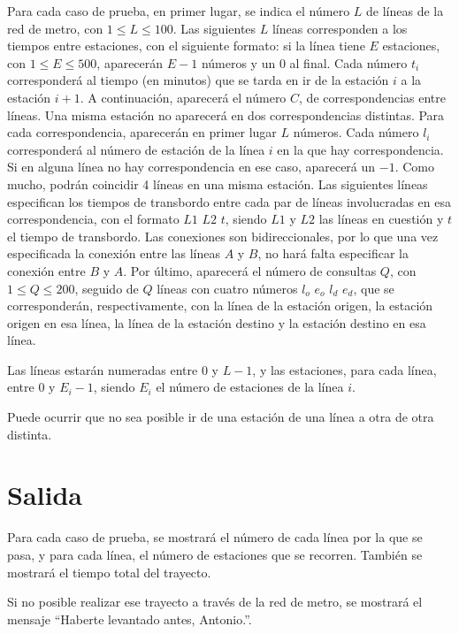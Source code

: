 \documentclass[a4paper]{article}
\begin{document}
Para cada caso de prueba, en primer lugar, se indica el número \(L\) de líneas de la red de metro, con \(1 \leq L \leq 100\). Las siguientes \(L\) líneas corresponden a los tiempos entre estaciones, con el siguiente formato: si la línea tiene \(E\) estaciones, con \(1 \leq E \leq 500\), aparecerán \(E - 1\) números y un \(0\) al final. Cada número \(t_i\) corresponderá al tiempo (en minutos) que se tarda en ir de la estación \(i\) a la estación \(i + 1\). A continuación, aparecerá el número \(C\), de correspondencias entre líneas. Una misma estación no aparecerá en dos correspondencias distintas. Para cada correspondencia, aparecerán en primer lugar \(L\) números. Cada número \(l_i\) corresponderá al número de estación de la línea \(i\) en la que hay correspondencia. Si en alguna línea no hay correspondencia en ese caso, aparecerá un \(-1\). Como mucho, podrán coincidir 4 líneas en una misma estación. Las siguientes líneas especifican los tiempos de transbordo entre cada par de líneas involucradas en esa correspondencia, con el formato \(L1\) \(L2\) \(t\), siendo \(L1\) y \(L2\) las líneas en cuestión y \(t\) el tiempo de transbordo. Las conexiones son bidireccionales, por lo que una vez especificada la conexión entre las líneas \(A\) y \(B\), no hará falta especificar la conexión entre \(B\) y \(A\). Por último, aparecerá el número de consultas \(Q\), con \(1 \leq Q \leq 200\), seguido de \(Q\) líneas con cuatro números \(l_o\) \(e_o\) \(l_d\) \(e_d\), que se corresponderán, respectivamente, con la línea de la estación origen, la estación origen en esa línea, la línea de la estación destino y la estación destino en esa línea.

Las líneas estarán numeradas entre \(0\) y \(L - 1\), y las estaciones, para cada línea, entre \(0\) y \(E_i - 1\), siendo \(E_i\) el número de estaciones de la línea \(i\).

Puede ocurrir que no sea posible ir de una estación de una línea a otra de otra distinta.

\section*{Salida}

Para cada caso de prueba, se mostrará el número de cada línea por la que se pasa, y para cada línea, el número de estaciones que se recorren. También se mostrará el tiempo total del trayecto.

Si no posible realizar ese trayecto a través de la red de metro, se mostrará el mensaje ``Haberte levantado antes, Antonio.''.
\end{document}
